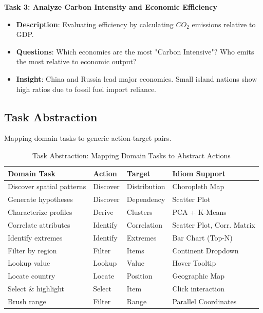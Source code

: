 \documentclass[conference]{IEEEtran}
\begin{document}
\textbf{Task 3: Analyze Carbon Intensity and Economic Efficiency}
\begin{itemize}
    \item \textbf{Description}: Evaluating efficiency by calculating $CO_{2}$ emissions relative to GDP.
    \item \textbf{Questions}: Which economies are the most "Carbon Intensive"? Who emits the most relative to economic output?
    \item \textbf{Insight}: China and Russia lead major economies. Small island nations show high ratios due to fossil fuel import reliance.
\end{itemize}

\subsection{Task Abstraction}
Mapping domain tasks to generic action-target pairs.

\begin{table}[H]
\centering
\caption{Task Abstraction: Mapping Domain Tasks to Abstract Actions}
\label{tab:task_abstraction}
\small
\begin{tabular}{|p{1.8cm}|p{1.8cm}|p{1.5cm}|p{2.0cm}|}
\hline
\textbf{Domain Task} & \textbf{Action} & \textbf{Target} & \textbf{Idiom Support} \\
\hline
Discover spatial patterns & Discover & Distribution & Choropleth Map \\
\hline
Generate hypotheses & Discover & Dependency & Scatter Plot \\
\hline
Characterize profiles & Derive & Clusters & PCA + K-Means \\
\hline
Correlate attributes & Identify & Correlation & Scatter Plot, Corr. Matrix \\
\hline
Identify extremes & Identify & Extremes & Bar Chart (Top-N) \\
\hline
Filter by region & Filter & Items & Continent Dropdown \\
\hline
Lookup value & Lookup & Value & Hover Tooltip \\
\hline
Locate country & Locate & Position & Geographic Map \\
\hline
Select \& highlight & Select & Item & Click interaction \\
\hline
Brush range & Filter & Range & Parallel Coordinates \\
\hline
\end{tabular}
\end{table}
\end{document}
